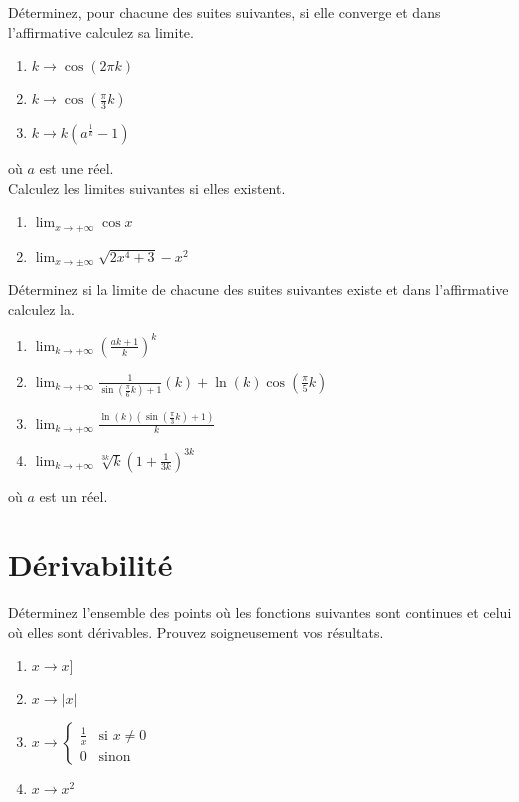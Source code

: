 %

\exerNico Déterminez, pour chacune des suites suivantes, si elle converge
et dans l'affirmative calculez sa limite.
\begin{enumerate}
\item $  k \rightarrow  \cos( 2 \pi k) $
\item $  k \rightarrow  \cos(\frac{\pi}{3} k) $
\item $  k \rightarrow  k(a ^\frac{1}{k} -1 ) $
\end{enumerate}
où $a$ est une réel.\\



\exerNico Calculez  les limites suivantes si elles existent.
\begin{enumerate}
\item $  \lim_{x \rightarrow  +\infty} \cos x $
\item $  \lim_{x \rightarrow  \pm \infty }\sqrt{2x^4+3}-x^2 $

\end{enumerate}

\exerNico Déterminez si la limite de chacune des suites suivantes
existe et dans l'affirmative calculez la.
\begin{enumerate}
\item $  \lim_{k \rightarrow  +\infty }(\frac{a k +1}{k})^k $
\item $  \lim_{k \rightarrow  +\infty}\frac{1}{\sin(\frac{\pi}{6}k)+1}(k) + \ln(k)\cos(\frac{\pi}{5}k)$
\item $  \lim_{k \rightarrow  +\infty} \frac{\ln(k)(\sin(\frac{\pi}{3}k) +1)}{k} $
\item $  \lim_{k \rightarrow  +\infty } \sqrt[3k]{k} (1 +
\frac{1}{3k})^{3k} $
\end{enumerate}
où $a$ est un réel. 

\section{Dérivabilité}



\exerNico Déterminez l'ensemble des points où les fonctions suivantes
sont continues et celui où elles sont dérivables. Prouvez soigneusement
vos résultats.
\begin{enumerate}
\item $ x \rightarrow x]$
\item $ x \rightarrow |x| $
\item $ x \rightarrow
	\left\{ \begin{array}{ll}
	\frac{1}{x} & \mbox{si } x \not= 0 \\
	0 & \mbox{sinon}
	\end{array} \right. $
\item $ x \rightarrow x^2  $
\end{enumerate}




